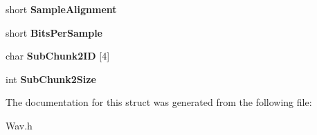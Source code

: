 \begin{DoxyCompactItemize}
short {\bfseries Sample\+Alignment}
\item 
\mbox{\label{structWAV__HEADER_a2d07ad1e8f9cc4283fe815f2e19280fb}} 
short {\bfseries Bits\+Per\+Sample}
\item 
\mbox{\label{structWAV__HEADER_a1f3735cd90aaa9fc7cfb2b91c8244359}} 
char {\bfseries Sub\+Chunk2\+ID} \mbox{[}4\mbox{]}
\item 
\mbox{\label{structWAV__HEADER_afe043c070454cc67517fab9a5d21cbbc}} 
int {\bfseries Sub\+Chunk2\+Size}
\end{DoxyCompactItemize}


The documentation for this struct was generated from the following file\+:\begin{DoxyCompactItemize}
\item 
Wav.\+h\end{DoxyCompactItemize}
